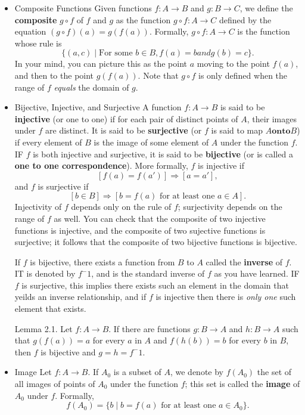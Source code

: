 \documentclass[a4paper]{report}
\begin{document}
\begin{itemize}
\item Composite Functions
		Given functions $f : A \longrightarrow B$ and $g: B \longrightarrow C$, we define the \textbf{composite} $g \circ f$ of $f$ and $g$ as the function $g \circ f : A \longrightarrow C $ defined by the equation $(g \circ f)(a) = g(f(a))$. 
		Formally, $g \circ f : A \longrightarrow C$ is the function whose rule is
		\[
			\{(a, c) \mid \text{For some } b \in B, f(a) = b and g(b) = c\}. 
		\]
		In your mind, you can picture this as the point $a$ moving to the point $f(a)$, and then to the point $g(f(a))$. 
		Note that $g \circ f$ is only defined when the range of $f$ \textit{equals} the domain of $g$. 

\item Bijective, Injective, and Surjective
	A function $f: A \longrightarrow B$ is said to be \textbf{injective} (or one to one) if for each pair of distinct points of $A$, their images under $f$ are distinct. It is said to be \textbf{surjective} (or $f$ is said to map $ A \textbf{onto} B$) if every element of $B$ is the image of some element of $A$ under the function $f$. IF $f$ is both injective and surjective, it is said to be \textbf{bijective} (or is called a \textbf{one to one correspondence}). 
		More formally, $f$ is injective if
		$$
			[f(a) = f(a')] \Longrightarrow [a = a'], 
		$$ 
		and $f$ is surjective if 
		$$ 
			[b \in B] \Longrightarrow [b = f(a) \text{ for at least one } a \in A]. 
		$$ 
	Injectivity of $f$ depends only on the rule of $f$; surjectivity depends on the range of $f$ as well. You can check that the composite of two injective functions is injective, and the composite of two sujective functions is surjective; it follows that the composite of two bijective functions is bijective. 
	
	If $f$ is bijective, there exists a function from $B$ to $A$ called the \textbf{inverse} of $f$. IT is denoted by $f^-1$, and is the standard inverse of $f$ as you have learned. IF $f$ is surjective, this implies there exists such an element in the domain that yeilds an inverse relationship, and if $f$ is injective then there is \textit{only one} such element that exists. 

	Lemma 2.1. Let $f: A \longrightarrow B$. If there are functions $g: B \longrightarrow A$ and $h: B \longrightarrow A$ such that $g(f(a)) = a$ for every $a$ in $A$ and $f(h(b)) = b$ for every $b$ in $B$, then $f$ is bijective and $g = h = f^-{1}$. 

\item Image
	Let $f: A \longrightarrow B$. If $A_{0}$ is a subset of $A$, we denote by $f(A_{0})$ the set of all images of points of $A_{0}$ under the function $f$; this set is called the \textbf{image} of $A_{0}$ under $f$. Formally, 
	\[
		f(A_{0}) = \{ b \mid b = f(a) \text{ for at least one } a \in A_{0}\}. 
	\]


\end{itemize}
\end{document}
